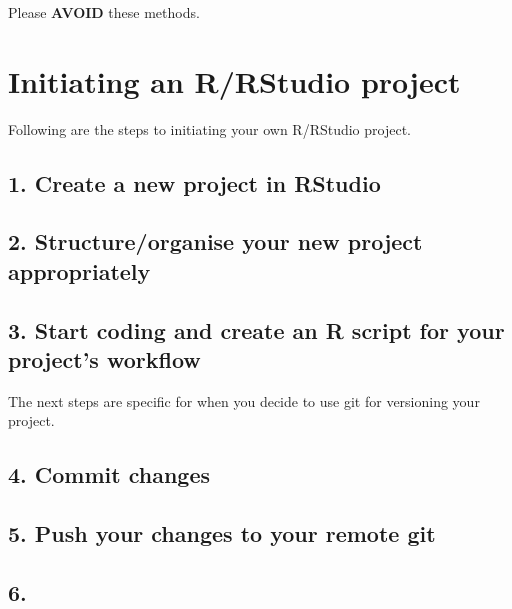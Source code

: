 \documentclass[
  12pt,
]{book}
\begin{document}
Please \textbf{AVOID} these methods.

\hypertarget{initiate-projects}{%
\chapter{Initiating an R/RStudio project}\label{initiate-projects}}

Following are the steps to initiating your own R/RStudio project.

\hypertarget{create-a-new-project-in-rstudio}{%
\section{1. Create a new project in RStudio}\label{create-a-new-project-in-rstudio}}

\hypertarget{structureorganise-your-new-project-appropriately}{%
\section{2. Structure/organise your new project appropriately}\label{structureorganise-your-new-project-appropriately}}

\hypertarget{start-coding-and-create-an-r-script-for-your-projects-workflow}{%
\section{3. Start coding and create an R script for your project's workflow}\label{start-coding-and-create-an-r-script-for-your-projects-workflow}}

The next steps are specific for when you decide to use git for versioning your project.

\hypertarget{commit-changes}{%
\section{4. Commit changes}\label{commit-changes}}

\hypertarget{push-your-changes-to-your-remote-git}{%
\section{5. Push your changes to your remote git}\label{push-your-changes-to-your-remote-git}}

\hypertarget{section}{%
\section{6.}\label{section}}
\end{document}
